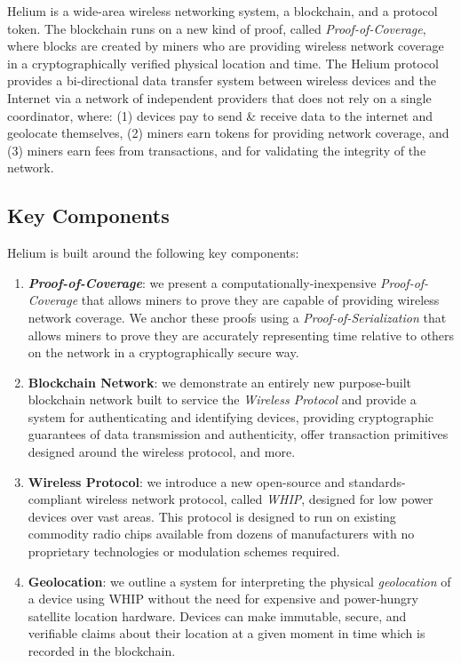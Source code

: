 \documentclass[UTF8, 10pt, nonatbib, nocopyrightspace, reprint]{sigplanconf}
\begin{document}
Helium is a wide-area wireless networking system, a blockchain, and a protocol token. The blockchain runs on a new kind of proof, called \emph{Proof-of-Coverage}, where blocks are created by miners who are providing wireless network coverage in a cryptographically verified physical location and time. The Helium protocol provides a bi-directional data transfer system between wireless devices and the Internet via a network of independent providers that does not rely on a single coordinator, where: (1) devices pay to send \& receive data to the internet and geolocate themselves, (2) miners earn tokens for providing network coverage, and (3) miners earn fees from transactions, and for validating the integrity of the network.

\subsection{Key Components}

Helium is built around the following key components:

\begin{enumerate}
  \item \textbf{\emph{Proof-of-Coverage}}: we present a computationally-inexpensive \emph{Proof-of-Coverage} that allows miners to prove they are capable of providing wireless network coverage. We anchor these proofs using a \emph{Proof-of-Serialization} that allows miners to prove they are accurately representing time relative to others on the network in a cryptographically secure way.

  \item \textbf{Blockchain Network}: we demonstrate an entirely new purpose-built blockchain network built to service the \emph{Wireless Protocol} and provide a system for authenticating and identifying devices, providing cryptographic guarantees of data transmission and authenticity, offer transaction primitives designed around the wireless protocol, and more.

    \item \textbf{Wireless Protocol}: we introduce a new open-source and standards-compliant wireless network protocol, called \emph{WHIP}, designed for low power devices over vast areas. This protocol is designed to run on existing commodity radio chips available from dozens of manufacturers with no proprietary technologies or modulation schemes required.

    \item \textbf{Geolocation}: we outline a system for interpreting the physical \emph{geolocation} of a device using WHIP without the need for expensive and power-hungry satellite location hardware. Devices can make immutable, secure, and verifiable claims about their location at a given moment in time which is recorded in the blockchain.
\end{enumerate}
\end{document}
